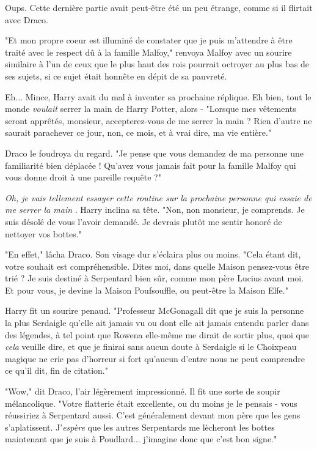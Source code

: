 Oups. Cette dernière partie avait peut-être été un peu étrange, comme si il flirtait avec Draco.

"Et mon propre coeur est illuminé de constater que je puis m'attendre à être traité avec le respect dû à la famille Malfoy," renvoya Malfoy avec un sourire similaire à l'un de ceux que le plus haut des rois pourrait octroyer au plus bas de ses sujets, si ce sujet était honnête en dépit de sa pauvreté.

Eh... Mince, Harry avait du mal à inventer sa prochaine réplique. Eh bien, tout le monde \emph{voulait}  serrer la main de Harry Potter, alors - "Lorsque mes vêtements seront apprêtés, monsieur, accepterez-vous de me serrer la main ? Rien d'autre ne saurait parachever ce jour, non, ce mois, et à vrai dire, ma vie entière."

Draco le foudroya du regard. "Je pense que vous demandez de ma personne une familiarité bien déplacée ! Qu'avez vous jamais fait pour la famille Malfoy qui vous donne droit à une pareille requête ?"

\emph{Oh, je vais tellement essayer cette routine sur la prochaine personne qui essaie de me serrer la main} . Harry inclina sa tête. "Non, non monsieur, je comprends. Je suis désolé de vous l'avoir demandé. Je devrais plutôt me sentir honoré de nettoyer vos bottes."

"En effet," lâcha Draco. Son visage dur s'éclaira plus ou moins. "Cela étant dit, votre souhait est compréhensible. Dites moi, dans quelle Maison pensez-vous être trié ? Je suis destiné à Serpentard bien sûr, comme mon père Lucius avant moi. Et pour vous, je devine la Maison Poufsouffle, ou peut-être la Maison Elfe."

Harry fit un sourire penaud. "Professeur McGonagall dit que je suis la personne la plus Serdaigle qu'elle ait jamais vu ou dont elle ait jamais entendu parler dans des légendes, à tel point que Rowena elle-même me dirait de sortir plus, quoi que \emph{cela}  veuille dire, et que je finirai sans aucun doute à Serdaigle si le Choixpeau magique ne crie pas d'horreur si fort qu'aucun d'entre nous ne peut comprendre ce qu'il dit, fin de citation."

"Wow," dit Draco, l'air légèrement impressionné. Il fit une sorte de soupir mélancolique. "Votre flatterie était excellente, ou du moins je le pensais - vous réussiriez à Serpentard aussi. C'est généralement devant mon père que les gens s'aplatissent. J'\emph{espère}  que les autres Serpentards me lècheront les bottes maintenant que je suis à Poudlard... j'imagine donc que c'est bon signe."

